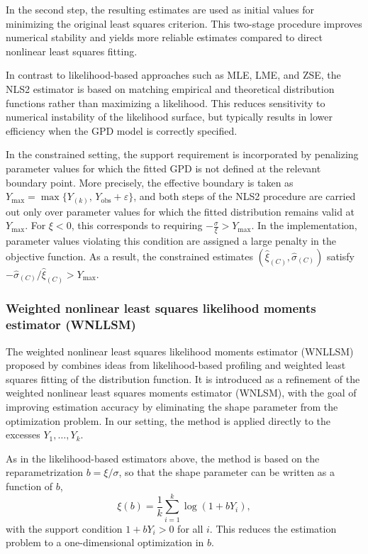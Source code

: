 In the second step, the resulting estimates are used as initial values for minimizing the original least squares criterion. This two-stage procedure improves numerical stability and yields more reliable estimates compared to direct nonlinear least squares fitting.

In contrast to likelihood-based approaches such as MLE, LME, and ZSE, the NLS2 estimator is based on matching empirical and theoretical distribution functions rather than maximizing a likelihood. This reduces sensitivity to numerical instability of the likelihood surface, but typically results in lower efficiency when the GPD model is correctly specified.

In the constrained setting, the support requirement is incorporated by penalizing parameter values for which the fitted GPD is not defined at the relevant boundary point. More precisely, the effective boundary is taken as
$Y_{\max} = \max\{Y_{(k)},\, Y_{\mathrm{obs}}+\varepsilon\}$,
and both steps of the NLS2 procedure are carried out only over parameter values for which the fitted distribution remains valid at $Y_{\max}$. For $\xi < 0$, this corresponds to requiring
$-\frac{\sigma}{\xi} > Y_{\max}$.
In the implementation, parameter values violating this condition are assigned a large penalty in the objective function. As a result, the constrained estimates $(\hat{\xi}_{(C)}, \hat{\sigma}_{(C)})$ satisfy $-\hat{\sigma}_{(C)}/\hat{\xi}_{(C)} > Y_{\max}$.

\subsubsection*{Weighted nonlinear least squares likelihood moments estimator (WNLLSM)}

The weighted nonlinear least squares likelihood moments estimator (WNLLSM) proposed by \citet{zhao2019new} combines ideas from likelihood-based profiling and weighted least squares fitting of the distribution function. It is introduced as a refinement of the weighted nonlinear least squares moments estimator (WNLSM), with the goal of improving estimation accuracy by eliminating the shape parameter from the optimization problem. In our setting, the method is applied directly to the excesses $Y_1,\dots,Y_k$.

As in the likelihood-based estimators above, the method is based on the reparametrization
$b = \xi/\sigma$, so that the shape parameter can be written as a function of $b$,
\begin{equation}
\xi(b) = \frac{1}{k}\sum_{i=1}^k \log(1 + bY_i),
\end{equation}
with the support condition $1 + bY_i > 0$ for all $i$. This reduces the estimation problem to a one-dimensional optimization in $b$.

